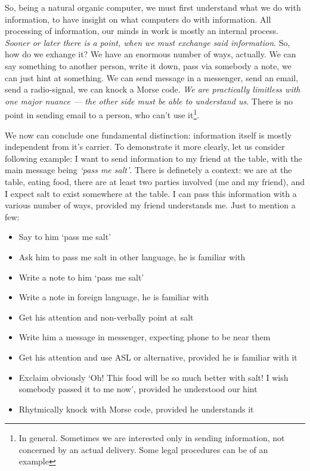 \documentclass{article}
\begin{document}
            So, being a natural organic computer, we must first understand what we do with information, to have insight on what computers do with information. All processing 
            of information, our minds in work is mostly an internal process. \emph{Sooner or later there is a point, when we must exchange said information}. So, how do we
            exhange it? We have an enormous number of ways, actually. We can say something to another person, write it down, pass via somebody a note, we can just hint at something.
            We can send message in a messenger, send an email, send a radio-signal, we can knock a Morse code. \emph{We are practically limitless with one major nuance --- the other
            side must be able to understand us}. There is no point in sending email to a person, who can't use it\footnote{In general. Sometimes we are interested only
            in sending information, not concerned by an actual delivery. Some legal procedures can be of an example}. \par

            We now can conclude one fundamental distinction: information itself is mostly independent from it's carrier. To demonstrate it more clearly, let us consider
            following example: I want to send information to my friend at the table, with the main message being \emph{`pass me salt'}. There is definetely a context:
            we are at the table, eating food, there are at least two parties involved (me and my friend), and I expect salt to exist somewhere at the table. I can pass this 
            information with a various number of ways, provided my friend understands me. Just to mention a few:

            \begin{itemize}
                \item Say to him `pass me salt'
                \item Ask him to pass me salt in other language, he is familiar with
                \item Write a note to him `pass me salt'
                \item Write a note in foreign language, he is familiar with
                \item Get his attention and non-verbally point at salt
                \item Write him a message in messenger, expecting phone to be near them
                \item Get his attention and use ASL or alternative, provided he is familiar with it
                \item Exclaim obviously `Oh! This food will be so much better with salt! I wish somebody passed it to me now', provided he understood our hint
                \item Rhytmically knock with Morse code, provided he understands it
            \end{itemize}
\end{document}
